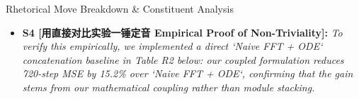 \begin{TipBox}{Rhetorical Move Breakdown \& Constituent Analysis}
\begin{itemize}[leftmargin=1.5em]
  \item \textbf{S4 [用直接对比实验一锤定音 Empirical Proof of Non-Triviality]:} \textit{To verify this empirically, we implemented a direct `Naive FFT + ODE` concatenation baseline in Table R2 below: our coupled formulation reduces 720-step MSE by 15.2\% over `Naive FFT + ODE`, confirming that the gain stems from our mathematical coupling rather than module stacking.}\par{}
\end{itemize}
\end{TipBox}
\medskip
